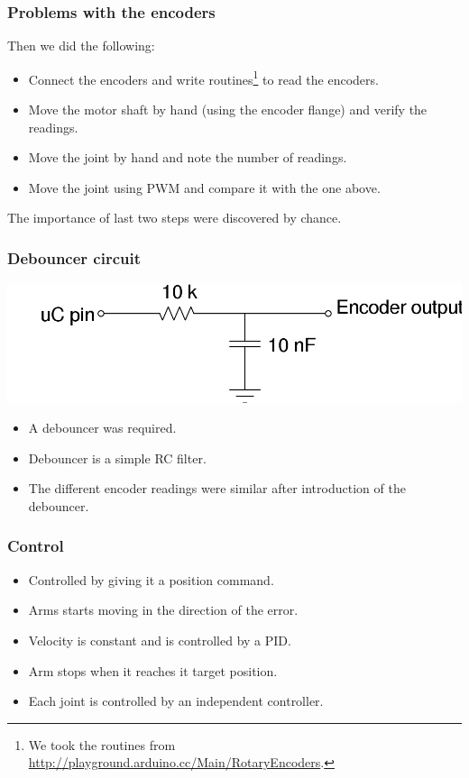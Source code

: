\documentclass{beamer}
\begin{document}
  \begin{frame}
    
    \frametitle{Problems with the encoders}
    Then we did the following:
    \begin{itemize}
    \item<2-> Connect the encoders and write routines\footnote{We took the routines from
    \url{http://playground.arduino.cc/Main/RotaryEncoders}.} to read the
      encoders.
    \item<3-> Move the motor shaft by hand (using the encoder flange) and
      verify the readings.
    \item<4-> Move the joint by hand and note the number of readings.
    \item<5-> Move the joint using PWM and compare it with the one above.
    \end{itemize}
    
     The importance of last two steps were discovered by chance.\\
  \end{frame}
  
  \begin{frame}
    \frametitle{Debouncer circuit}
    \includegraphics[scale=0.3]{../Report/debouncer.jpg}\\
    \vspace{1cm}
    \begin{itemize}
    \item<1-> A debouncer was required.
    \item<2-> Debouncer is a  simple RC filter.
    \item<3-> The different encoder readings were similar after
    introduction of the debouncer.
    \end{itemize}
  \end{frame}

\begin{frame}
	\frametitle{Control}
	\begin{itemize}
      \item<1-> Controlled by giving it a position command.
      \item<1-> Arms starts moving in the direction of the error.
      \item<2-> Velocity is constant and is controlled by a PID.
      \item<2-> Arm stops when it reaches it target position.
      \item<3-> Each joint is controlled by an independent controller.
    \end{itemize}
  \end{frame}
  
\end{document}
